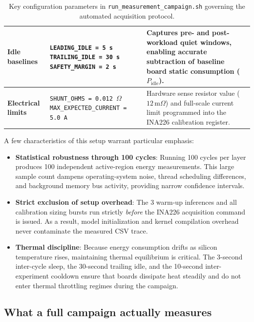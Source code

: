 \begin{table}
\begin{tabular}{@{} p{2.5cm} p{4.3cm} p{6.5cm} @{}}
        \midrule
        \textbf{Idle baselines} & 
        \texttt{LEADING\_IDLE = 5\,s} \newline
        \texttt{TRAILING\_IDLE = 30\,s} \newline
        \texttt{SAFETY\_MARGIN = 2\,s} & 
        Captures pre- and post-workload quiet windows, enabling accurate subtraction of baseline board static consumption ($P_{\text{idle}}$). \\
        \midrule
        \textbf{Electrical limits} & 
        \texttt{SHUNT\_OHMS = 0.012\,$\Omega$} \newline
        \texttt{MAX\_EXPECTED\_CURRENT = 5.0\,A} & 
        Hardware sense resistor value ($12\,\text{m}\Omega$) and full-scale current limit programmed into the INA226 calibration register. \\
        \bottomrule
    \end{tabular}
    \caption[Key configuration parameters in campaign launcher]{Key configuration parameters in \texttt{run\_measurement\_campaign.sh} governing the automated acquisition protocol.}
    \label{tab:campaign_parameters}
\end{table}

A few characteristics of this setup warrant particular emphasis:
\begin{itemize}
    \item \textbf{Statistical robustness through 100 cycles}: Running 100 cycles per layer produces 100 independent active-region energy measurements. This large sample count dampens operating-system noise, thread scheduling differences, and background memory bus activity, providing narrow confidence intervals.
    \item \textbf{Strict exclusion of setup overhead}: The 3 warm-up inferences and all calibration sizing bursts run strictly \emph{before} the INA226 acquisition command is issued. As a result, model initialization and kernel compilation overhead never contaminate the measured CSV trace.
    \item \textbf{Thermal discipline}: Because energy consumption drifts as silicon temperature rises, maintaining thermal equilibrium is critical. The 3-second inter-cycle sleep, the 30-second trailing idle, and the 10-second inter-experiment cooldown ensure that boards dissipate heat steadily and do not enter thermal throttling regimes during the campaign.
\end{itemize}

\subsection{What a full campaign actually measures}

